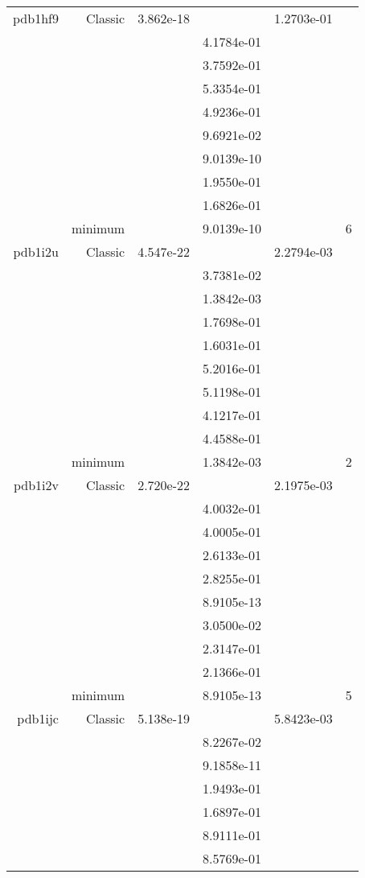 \begin{xltabular}{\textwidth}{r|rS[table-format=1.3e+2]S[table-format=1.4e+2]S[table-format=1.4e+2]S[table-format=-1.5]}
pdb1hf9 & Classic & 3.862e-18 &  & 1.2703e-01 & \\
&  &  & 4.1784e-01 & & \\
&  &  & 3.7592e-01 & & \\
&  &  & 5.3354e-01 & & \\
&  &  & 4.9236e-01 & & \\
&  &  & 9.6921e-02 & & \\
&  &  & 9.0139e-10 & & \\
&  &  & 1.9550e-01 & & \\
&  &  & 1.6826e-01 & & \\
& minimum &  & 9.0139e-10 & & 6 \\  \addlinespace
pdb1i2u & Classic & 4.547e-22 &  & 2.2794e-03 & \\
&  &  & 3.7381e-02 & & \\
&  &  & 1.3842e-03 & & \\
&  &  & 1.7698e-01 & & \\
&  &  & 1.6031e-01 & & \\
&  &  & 5.2016e-01 & & \\
&  &  & 5.1198e-01 & & \\
&  &  & 4.1217e-01 & & \\
&  &  & 4.4588e-01 & & \\
& minimum &  & 1.3842e-03 & & 2 \\  \addlinespace
pdb1i2v & Classic & 2.720e-22 &  & 2.1975e-03 & \\
&  &  & 4.0032e-01 & & \\
&  &  & 4.0005e-01 & & \\
&  &  & 2.6133e-01 & & \\
&  &  & 2.8255e-01 & & \\
&  &  & 8.9105e-13 & & \\
&  &  & 3.0500e-02 & & \\
&  &  & 2.3147e-01 & & \\
&  &  & 2.1366e-01 & & \\
& minimum &  & 8.9105e-13 & & 5 \\  \addlinespace
pdb1ijc & Classic & 5.138e-19 &  & 5.8423e-03 & \\
&  &  & 8.2267e-02 & & \\
&  &  & 9.1858e-11 & & \\
&  &  & 1.9493e-01 & & \\
&  &  & 1.6897e-01 & & \\
&  &  & 8.9111e-01 & & \\
&  &  & 8.5769e-01 & & \\

\end{xltabular}
